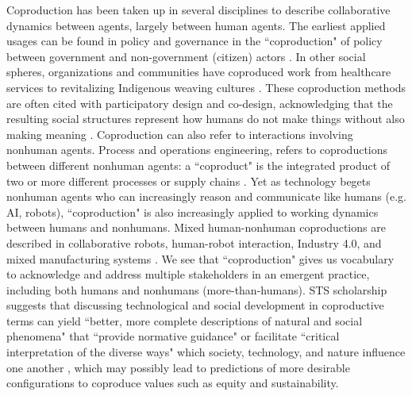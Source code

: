 Coproduction has been taken up in several disciplines to describe collaborative dynamics between agents, largely between human agents. The earliest applied usages can be found in policy and governance in the ``coproduction" of policy between government and non-government (citizen) actors \cite{chen_withshare_2019,bisello_living_2017}. In other social spheres, organizations and communities have coproduced work from healthcare services \cite{rose_power_2019} to revitalizing Indigenous weaving cultures \cite{athayde_reconnecting_2017}. These coproduction methods are often cited with participatory design and co-design, acknowledging that the resulting social structures represent how humans do not make things without also making meaning \cite{jasanoff_states_2010}. Coproduction can also refer to interactions involving nonhuman agents. Process and operations engineering, refers to coproductions between different nonhuman agents: a ``coproduct" is the integrated product of two or more different processes or supply chains \cite{akin_linen_2013,lin_designing_2020}. Yet as technology begets nonhuman agents who can increasingly reason and communicate like humans (e.g. AI, robots), ``coproduction" is also increasingly applied to working dynamics between humans and nonhumans. Mixed human-nonhuman coproductions are described in collaborative robots, human-robot interaction, Industry 4.0, and mixed manufacturing systems \cite{cencen_design_2018,dukalski_portable_2017}. We see that ``coproduction" gives us vocabulary to acknowledge and address multiple stakeholders in an emergent practice, including both humans and nonhumans (more-than-humans). STS scholarship suggests that discussing technological and social development in coproductive terms can yield ``better, more complete descriptions of natural and social phenomena" that ``provide normative guidance" or facilitate ``critical interpretation of the diverse ways" which society, technology, and nature influence one another \cite{jasanoff_states_2010,jasanoff_dreamscapes_2015}, which may possibly lead to predictions of more desirable configurations to coproduce values such as equity and sustainability.

